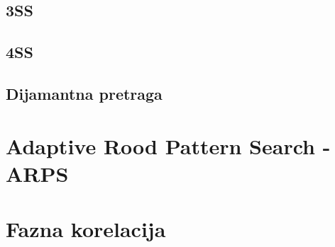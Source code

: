 \subsection{3SS}

\subsection{4SS}

\subsection{Dijamantna pretraga}

\section{Adaptive Rood Pattern Search - ARPS}

\section{Fazna korelacija}